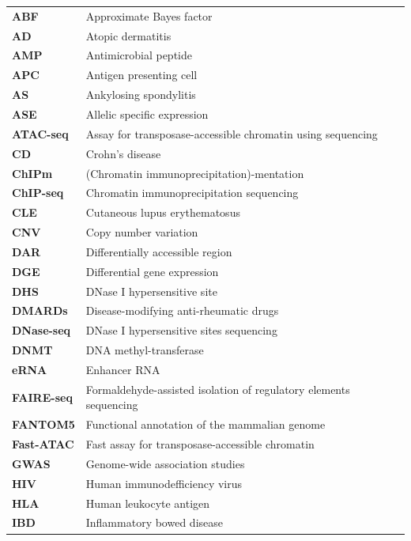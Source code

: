 \begin{longtable}{p{2.5cm}p{12.5cm}}
\textbf{ABF} & Approximate Bayes factor\\
\textbf{AD} & Atopic dermatitis \\
\textbf{AMP} & Antimicrobial peptide\\
\textbf{APC} &Antigen presenting cell \\
\textbf{AS} & Ankylosing spondylitis\\
\textbf{ASE} & Allelic specific expression \\
\textbf{ATAC-seq} & Assay for transposase-accessible chromatin using sequencing \\
\textbf{CD} & Crohn's disease\\
\textbf{ChIPm} & (Chromatin immunoprecipitation)-mentation  \\
\textbf{ChIP-seq} & Chromatin immunoprecipitation sequencing\\
\textbf{CLE} & Cutaneous lupus erythematosus \\
\textbf{CNV} & Copy number variation\\
\textbf{DAR} & Differentially accessible region  \\
\textbf{DGE} & Differential gene expression\\
\textbf{DHS} & DNase I hypersensitive site\\
\textbf{DMARDs} & Disease-modifying anti-rheumatic drugs \\
\textbf{DNase-seq} & DNase I hypersensitive sites sequencing\\
\textbf{DNMT} & DNA methyl-transferase\\
\textbf{eRNA} & Enhancer RNA\\
\textbf{FAIRE-seq} & Formaldehyde-assisted isolation of regulatory elements sequencing \\
\textbf{FANTOM5} & Functional annotation of the mammalian genome\\
\textbf{Fast-ATAC} & Fast  assay for transposase-accessible chromatin \\
\textbf{GWAS} & Genome-wide association studies \\
\textbf{HIV} & Human immunodefficiency virus\\
\textbf{HLA} & Human leukocyte antigen\\
\textbf{IBD} & Inflammatory bowed disease\\

\end{longtable}
